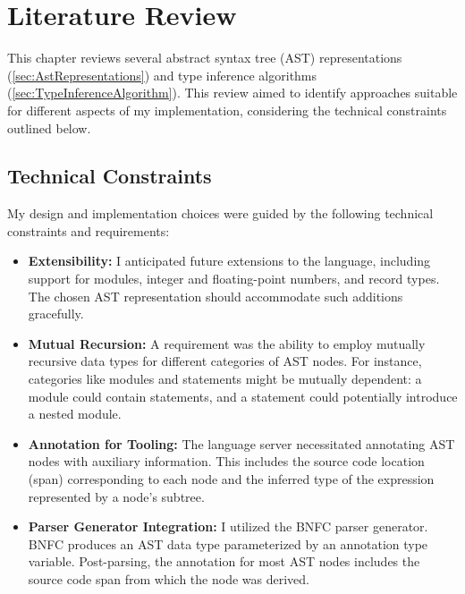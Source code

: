 \chapter{Literature Review}
\label{chap:LiteratureReview}

This chapter reviews several abstract syntax tree (AST) representations (\cref{sec:AstRepresentations}) and type inference algorithms (\cref{sec:TypeInferenceAlgorithm}). This review aimed to identify approaches suitable for different aspects of my implementation, considering the technical constraints outlined below.

\section{Technical Constraints}
\label{chap:LiteratureReview:sec:AstRepresentations:TechnicalConstraints}

My design and implementation choices were guided by the following technical constraints and requirements:

\begin{itemize}
  \item \textbf{Extensibility:} I anticipated future extensions to the language, including support for modules, integer and floating-point numbers, and record types. The chosen AST representation should accommodate such additions gracefully.
  \item \textbf{Mutual Recursion:} A requirement was the ability to employ mutually recursive data types for different categories of AST nodes. For instance, categories like modules and statements might be mutually dependent: a module could contain statements, and a statement could potentially introduce a nested module.
  \item \textbf{Annotation for Tooling:} The language server necessitated annotating AST nodes with auxiliary information. This includes the source code location (span) corresponding to each node and the inferred type of the expression represented by a node's subtree.
  \item \textbf{Parser Generator Integration:} I utilized the BNFC parser generator. BNFC produces an AST data type parameterized by an annotation type variable. Post-parsing, the annotation for most AST nodes includes the source code span from which the node was derived.
\end{itemize}

